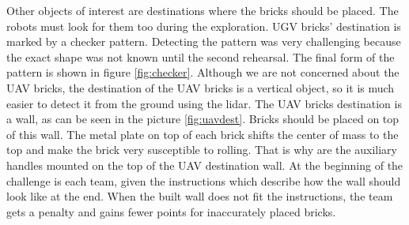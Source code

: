 Other objects of interest are destinations where the bricks should be placed. The robots must look for them too during the exploration. UGV bricks' destination is marked by a checker pattern. Detecting the pattern was very challenging because the exact shape was not known until the second rehearsal. The final form of the pattern is shown in figure \ref{fig:checker}. Although we are not concerned about the UAV bricks, the destination of the UAV bricks is a vertical object, so it is much easier to detect it from the ground using the lidar. The UAV bricks destination is a wall, as can be seen in the picture \ref{fig:uavdest}. Bricks should be placed on top of this wall. The metal plate on top of each brick shifts the center of mass to the top and make the brick very susceptible to rolling. That is why are the auxiliary handles mounted on the top of the UAV destination wall. At the beginning of the challenge is each team, given the instructions which describe how the wall should look like at the end. When the built wall does not fit the instructions, the team gets a penalty and gains fewer points for inaccurately placed bricks.


